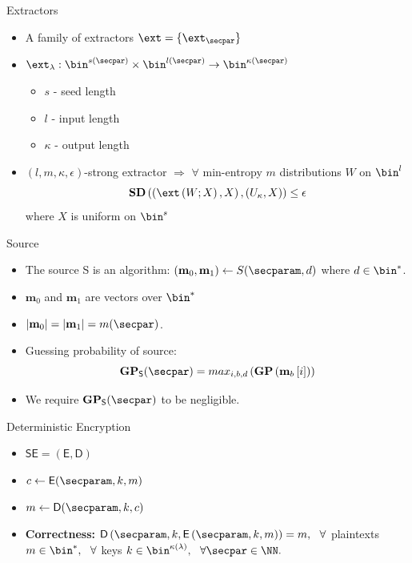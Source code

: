 \documentclass{beamer}
\newcommand{\smzero}{\textbf{m}_0}
\newcommand{\smone}{\textbf{m}_1}
\begin{document}
\begin{frame}{Extractors}
	\begin{itemize}
		\setlength\itemsep{1em}
		\item A family of extractors $\ext = \{\ext_{\secpar}\}$
		\item $\ext_{\lambda} : \bin^{s(\secpar)} \times \bin^{l(\secpar)} \rightarrow \bin^{\kappa(\secpar)}$
		\begin{itemize}
		    \item $s$ - seed length
		    \item $l$ - input length 
		    \item $\kappa$ - output length
		\end{itemize}
		\item $(l,m,\kappa,\epsilon)$-strong extractor $\Rightarrow$ $\forall$ min-entropy  $m$ distributions $W$ on $\bin^l$
		    \begin{equation*}
		        \textbf{SD}\left(\left( \ext\left( W; X\right), X \right), \left( U_\kappa,X \right) \right) \leq \epsilon
		    \end{equation*}
		 where $X$ is uniform on $\bin^s$
	\end{itemize}
\end{frame}

\begin{frame}{Source}
	\begin{itemize}
		\setlength\itemsep{1em}
		\item The source S is an algorithm: $(\smzero, \smone) \leftarrow S(\secparam, d)$ where $d \in \bin^*$.
		\item $\smzero$ and $\smone$ are vectors over $\bin^*$
		\item $|\smzero| = |\smone|= m(\secpar)$.
		\item Guessing probability of source:
		    \begin{equation*}
                \textbf{GP}_\mathsf{S}(\secpar) = max_{i,b,d}\left( \textbf{GP}\left( \textbf{m}_b \left[ i \right] \right) \right)
            \end{equation*}
        \item We require $\textbf{GP}_\mathsf{S}(\secpar)$ to be negligible.
	\end{itemize}
\end{frame}

\begin{frame}{Deterministic Encryption}
	\begin{itemize}
		\setlength\itemsep{1em}
		\item $\mathsf{SE=(E, D)}$
		\item $c \leftarrow \mathsf{E}(\secparam, k, m)$
		\item $m \leftarrow \mathsf{D}(\secparam, k, c)$
		\item \textbf{Correctness:}  $\mathsf{D} \left( \secparam , k, \mathsf{E} \left( \secparam , k, m \right) \right) = m,\ \  \forall$  plaintexts $m \in \bin^*,\ \  \forall$  keys $k \in \bin^{\kappa(\lambda)},\ \   \forall \secpar \in \NN.$
	\end{itemize}
\end{frame}
\end{document}
